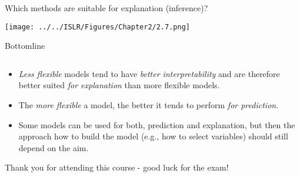 \documentclass[10pt,ignorenonframetext,]{beamer}
\providecommand{\tightlist}{%
  \setlength{\itemsep}{0pt}\setlength{\parskip}{0pt}}
\begin{document}
\begin{frame}

Which methods are suitable for explanation (inference)? \vspace{-2mm}

\centering

\texttt{[image: ../../ISLR/Figures/Chapter2/2.7.png]}

\end{frame}

\begin{frame}

\begin{block}{Bottomline}

\(~\)

\begin{itemize}
\tightlist
\item
  \emph{Less flexible} models tend to have \emph{better
  interpretability} and are therefore better suited \emph{for
  explanation} than more flexible models.
\end{itemize}

\vspace{2mm}

\begin{itemize}
\tightlist
\item
  The \emph{more flexible} a model, the better it tends to perform
  \emph{for prediction}.
\end{itemize}

\vspace{2mm}

\begin{itemize}
\tightlist
\item
  Some models can be used for both, prediction and explanation, but then
  the approach how to build the model (e.g., how to select variables)
  should still depend on the aim.
\end{itemize}

Thank you for attending this course - good luck for the exam!

\end{block}

\end{frame}
\end{document}
